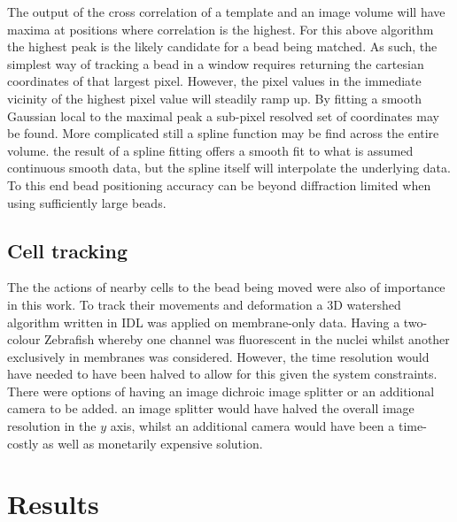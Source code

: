 The output of the cross correlation of a template and an image volume will have maxima at positions where correlation is the highest.
For this above algorithm the highest peak is the likely candidate for a bead being matched.
As such, the simplest way of tracking a bead in a window requires returning the cartesian coordinates of that largest pixel.
However, the pixel values in the immediate vicinity of the highest pixel value will steadily ramp up.
By fitting a smooth Gaussian local to the maximal peak a sub-pixel resolved set of coordinates may be found.
More complicated still a spline function may be find across the entire volume.
the result of a spline fitting offers a smooth fit to what is assumed continuous smooth data, but the spline itself will interpolate the underlying data.
To this end bead positioning accuracy can be beyond diffraction limited when using sufficiently large beads.

\subsection{Cell tracking}

The the actions of nearby cells to the bead being moved were also of importance in this work.
To track their movements and deformation a 3D watershed algorithm written in IDL was applied on membrane-only data.
Having a two-colour Zebrafish whereby one channel was fluorescent in the nuclei whilst another exclusively in membranes was considered.
However, the time resolution would have needed to have been halved to allow for this given the system constraints.
There were options of having an image dichroic image splitter or an additional camera to be added.
an image splitter would have halved the overall image resolution in the $y$ axis, whilst an additional camera would have been a time-costly as well as monetarily expensive solution.

\section{Results}

